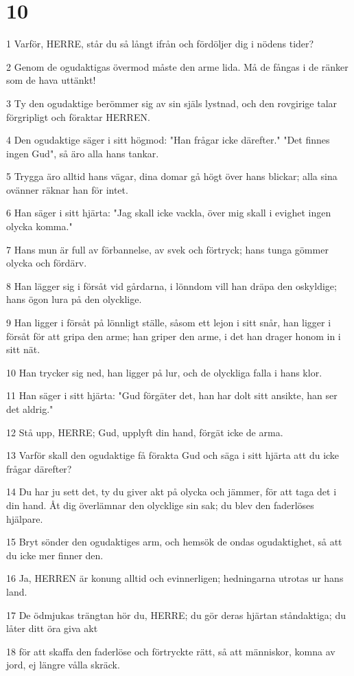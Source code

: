 \chapter{10}

\par 1 Varför, HERRE, står du så långt ifrån och fördöljer dig i nödens tider?
\par 2 Genom de ogudaktigas övermod måste den arme lida. Må de fångas i de ränker som de hava uttänkt!
\par 3 Ty den ogudaktige berömmer sig av sin själs lystnad, och den rovgirige talar förgripligt och föraktar HERREN.
\par 4 Den ogudaktige säger i sitt högmod: "Han frågar icke därefter." "Det finnes ingen Gud", så äro alla hans tankar.
\par 5 Trygga äro alltid hans vägar, dina domar gå högt över hans blickar; alla sina ovänner räknar han för intet.
\par 6 Han säger i sitt hjärta: "Jag skall icke vackla, över mig skall i evighet ingen olycka komma."
\par 7 Hans mun är full av förbannelse, av svek och förtryck; hans tunga gömmer olycka och fördärv.
\par 8 Han lägger sig i försåt vid gårdarna, i lönndom vill han dräpa den oskyldige; hans ögon lura på den olycklige.
\par 9 Han ligger i försåt på lönnligt ställe, såsom ett lejon i sitt snår, han ligger i försåt för att gripa den arme; han griper den arme, i det han drager honom in i sitt nät.
\par 10 Han trycker sig ned, han ligger på lur, och de olyckliga falla i hans klor.
\par 11 Han säger i sitt hjärta: "Gud förgäter det, han har dolt sitt ansikte, han ser det aldrig."
\par 12 Stå upp, HERRE; Gud, upplyft din hand, förgät icke de arma.
\par 13 Varför skall den ogudaktige få förakta Gud och säga i sitt hjärta att du icke frågar därefter?
\par 14 Du har ju sett det, ty du giver akt på olycka och jämmer, för att taga det i din hand. Åt dig överlämnar den olycklige sin sak; du blev den faderlöses hjälpare.
\par 15 Bryt sönder den ogudaktiges arm, och hemsök de ondas ogudaktighet, så att du icke mer finner den.
\par 16 Ja, HERREN är konung alltid och evinnerligen; hedningarna utrotas ur hans land.
\par 17 De ödmjukas trängtan hör du, HERRE; du gör deras hjärtan ståndaktiga; du låter ditt öra giva akt
\par 18 för att skaffa den faderlöse och förtryckte rätt, så att människor, komna av jord, ej längre vålla skräck.

